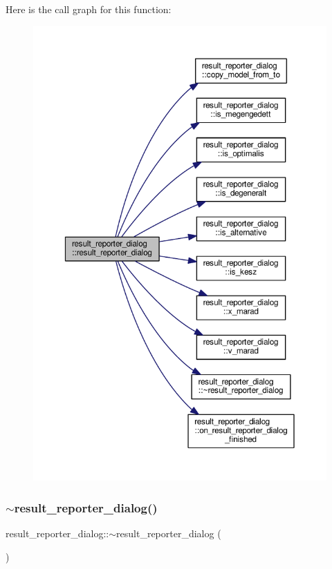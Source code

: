 Here is the call graph for this function\+:\nopagebreak
\begin{figure}[H]
\begin{center}
\leavevmode
\includegraphics[width=350pt]{classresult__reporter__dialog_a2edb2abb1360433138892c9fc2236506_cgraph}
\end{center}
\end{figure}
\mbox{\label{classresult__reporter__dialog_a1d44819c105ea7c09e87d73247cf0efc}} 
\subsubsection{\texorpdfstring{$\sim$result\+\_\+reporter\+\_\+dialog()}{~result\_reporter\_dialog()}\hspace{0.1cm}{\footnotesize\ttfamily [2/2]}}
{\footnotesize\ttfamily result\+\_\+reporter\+\_\+dialog\+::$\sim$result\+\_\+reporter\+\_\+dialog (\begin{DoxyParamCaption}{ }\end{DoxyParamCaption})}




